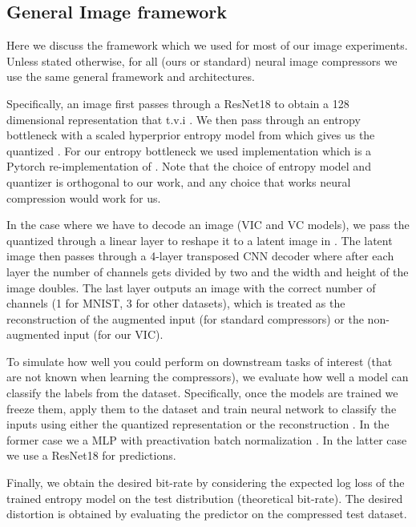\documentclass[final]{article}
\begin{document}
\subsection{General Image framework}
\label{appx:reproducability_general}

Here we discuss the framework which we used for most of our image experiments. Unless stated otherwise, for all (ours or standard) neural image compressors we use the same general framework and architectures.

Specifically, an image  first passes through a ResNet18 \cite{he_deep_2016} to obtain a 128 dimensional representation  that t.v.i .
We then pass  through an entropy bottleneck with a scaled hyperprior entropy model from \citet{balle_variational_2018} which gives us the quantized .
For our entropy bottleneck we used  implementation which is a Pytorch re-implementation of \cite{balle_variational_2018}.
Note that the choice of entropy model and quantizer is orthogonal to our work, and any choice that works neural compression would work for us.

In the case where we have to decode an image (VIC and VC models), we pass the quantized  through a linear layer to reshape it to a latent image in .
The latent image then passes through a 4-layer transposed CNN decoder where after each layer the number of channels gets divided by two and the width and height of the image doubles. 
The last layer outputs an image with the correct number of channels (1 for MNIST, 3 for other datasets), which is treated as the reconstruction  of the augmented input (for standard compressors) or the non-augmented input (for our VIC).

To simulate how well you could perform on downstream tasks of interest (that are not known when learning the compressors), we evaluate how well a model can classify the labels from the dataset.
Specifically, once the models are trained we freeze them, apply them to the dataset and train neural network to classify the inputs using either the quantized representation  or the reconstruction .
In the former case we a  MLP with preactivation batch normalization \cite{ioffe_batch_2015}.
In the latter case we use a ResNet18 for predictions.

Finally, we obtain the desired bit-rate by considering the expected log loss of the trained entropy model on the test distribution (\ie theoretical bit-rate).
The desired distortion is obtained by evaluating the predictor on the compressed test dataset.
\end{document}
